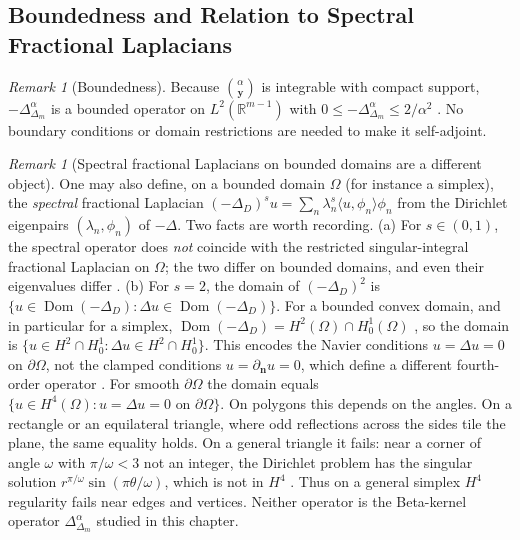 \documentclass[11pt,a4paper]{article}
\theoremstyle{plain}
\theoremstyle{definition}
\theoremstyle{remark}
\newtheorem{remark}[theorem]{Remark}
\numberwithin{equation}{section}
\begin{document}
\subsection{Boundedness and Relation to Spectral Fractional Laplacians}

\begin{remark}[Boundedness]
Because $\binom{\alpha}{\mathbf{y}}$ is integrable with compact support, $-\Delta_{\Delta_m}^\alpha$ is a bounded operator on $L^2(\mathbb{R}^{m-1})$ with $0 \le -\Delta_{\Delta_m}^\alpha \le 2/\alpha^2$ \cite{silvafilho2026simplex}. No boundary conditions or domain restrictions are needed to make it self-adjoint.
\end{remark}

\begin{remark}[Spectral fractional Laplacians on bounded domains are a different object]
\label{rem:spectral_fractional}
One may also define, on a bounded domain $\Omega$ (for instance a simplex), the \emph{spectral} fractional Laplacian $(-\Delta_D)^s u = \sum_n \lambda_n^s \langle u, \phi_n\rangle \phi_n$ from the Dirichlet eigenpairs $(\lambda_n,\phi_n)$ of $-\Delta$. Two facts are worth recording.
(a) For $s \in (0,1)$, the spectral operator does \emph{not} coincide with the restricted singular-integral fractional Laplacian on $\Omega$; the two differ on bounded domains, and even their eigenvalues differ \cite{servadei2014spectrum}.
(b) For $s = 2$, the domain of $(-\Delta_D)^2$ is $\{u \in \operatorname{Dom}(-\Delta_D) : \Delta u \in \operatorname{Dom}(-\Delta_D)\}$. For a bounded convex domain, and in particular for a simplex, $\operatorname{Dom}(-\Delta_D) = H^2(\Omega) \cap H^1_0(\Omega)$ \cite{grisvard1985elliptic}, so the domain is $\{u \in H^2 \cap H^1_0 : \Delta u \in H^2 \cap H^1_0\}$. This encodes the Navier conditions $u = \Delta u = 0$ on $\partial\Omega$, not the clamped conditions $u = \partial_{\mathbf{n}} u = 0$, which define a different fourth-order operator \cite{gazzola2010polyharmonic}. For smooth $\partial\Omega$ the domain equals $\{u \in H^4(\Omega) : u = \Delta u = 0 \text{ on } \partial\Omega\}$. On polygons this depends on the angles. On a rectangle or an equilateral triangle, where odd reflections across the sides tile the plane, the same equality holds. On a general triangle it fails: near a corner of angle $\omega$ with $\pi/\omega < 3$ not an integer, the Dirichlet problem has the singular solution $r^{\pi/\omega}\sin(\pi\theta/\omega)$, which is not in $H^4$ \cite{grisvard1985elliptic}. Thus on a general simplex $H^4$ regularity fails near edges and vertices.
Neither operator is the Beta-kernel operator $\Delta_{\Delta_m}^\alpha$ studied in this chapter.
\end{remark}
\end{document}

